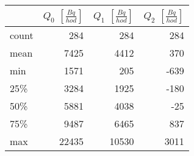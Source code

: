 \begin{tabular}{lrrr}
\toprule
{} &  $Q_0$ $\left[\si{\frac{Bq}{hod}}\right]$ &  $Q_1$ $\left[\si{\frac{Bq}{hod}}\right]$ &  $Q_2$ $\left[\si{\frac{Bq}{hod}}\right]$ \\
\midrule
count &                                       284 &                                       284 &                                       284 \\
mean  &                                      7425 &                                      4412 &                                       370 \\
min   &                                      1571 &                                       205 &                                      -639 \\
25\%   &                                      3284 &                                      1925 &                                      -180 \\
50\%   &                                      5881 &                                      4038 &                                       -25 \\
75\%   &                                      9487 &                                      6465 &                                       837 \\
max   &                                     22435 &                                     10530 &                                      3011 \\
\bottomrule
\end{tabular}
